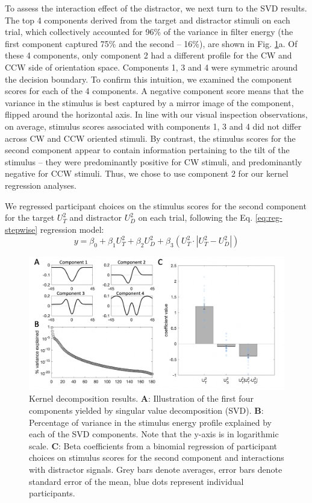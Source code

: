 \documentclass[a4paper, nobind]{templates/ociamthesis}
\begin{document}
To assess the interaction effect of the distractor, we next turn to the SVD results. The top 4 components derived from the target and distractor stimuli on each trial, which collectively accounted for 96\% of the variance in filter energy (the first component captured 75\% and the second -- 16\%), are shown in Fig. \ref{fig:distr-svd-a}a. Of these 4 components, only component 2 had a different profile for the CW and CCW side of orientation space. Components 1, 3 and 4 were symmetric around the decision boundary. To confirm this intuition, we examined the component scores for each of the 4 components. A negative component score means that the variance in the stimulus is best captured by a mirror image of the component, flipped around the horizontal axis. In line with our visual inspection observations, on average, stimulus scores associated with components 1, 3 and 4 did not differ across CW and CCW oriented stimuli. By contrast, the stimulus scores for the second component appear to contain information pertaining to the tilt of the stimulus -- they were predominantly positive for CW stimuli, and predominantly negative for CCW stimuli. Thus, we chose to use component 2 for our kernel regression analyses.

We regressed participant choices on the stimulus scores for the second component for the target \(U_T^2\) and distractor \(U_D^2\) on each trial, following the Eq. \eqref{eq:reg-stepwise} regression model:
\begin{equation}
y = \beta_0 + \beta_1U_T^2 + \beta_2U_D^2 + \beta_3(U_T^2\cdot|U_T^2-U_D^2|)
\label{eq:reg-svd}
\end{equation}

\begin{figure}

{\centering \includegraphics[width=1\linewidth]{figures/distr-svd-a} 

}

\caption[Experiment 1, Kernal decomposition results]{Kernel decomposition results. $\textbf{A:}$ Illustration of the first four components yielded by singular value decomposition (SVD). $\textbf{B:}$ Percentage of variance in the stimulus energy profile explained by each of the SVD components. Note that the y-axis is in logarithmic scale. $\textbf{C:}$ Beta coefficients from a binomial regression of participant choices on stimulus scores for the second component and interactions with distractor signals. Grey bars denote averages, error bars denote standard error of the mean, blue dots represent individual participants.}\label{fig:distr-svd-a}
\end{figure}
\end{document}
